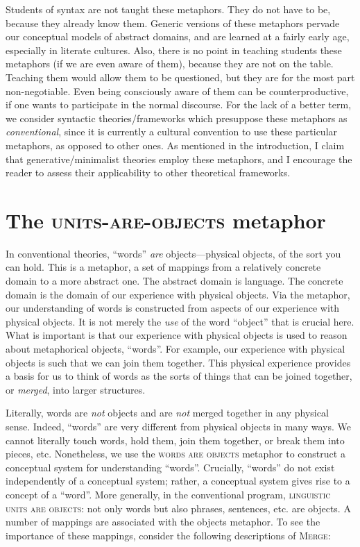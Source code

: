   Students of syntax are not taught these metaphors. They do not have to be, because they already know them. Generic versions of these metaphors pervade our conceptual models of abstract domains, and are learned at a fairly early age, especially in literate cultures. Also, there is no point in teaching students these metaphors (if we are even aware of them), because they are not on the table. Teaching them would allow them to be questioned, but they are for the most part non-negotiable. Even being consciously aware of them can be counterproductive, if one wants to participate in the normal discourse. For the lack of a better term, we consider syntactic theories/frameworks which presuppose these metaphors as \textit{conventional}, since it is currently a cultural convention to use these particular metaphors, as opposed to other ones. As mentioned in the introduction, I claim that generative/minimalist theories employ these metaphors, and I encourage the reader to assess their applicability to other theoretical frameworks.

\section{{The} {\textsc{units-}}{\textsc{are}}{\textsc{{}-objects}}{ metaphor}} 

In conventional theories, “words” \textit{are} objects---physical objects, of the sort you can hold. This is a metaphor, a set of mappings from a relatively concrete domain to a more abstract one. The abstract domain is language. The concrete domain is the domain of our experience with physical objects. Via the metaphor, our understanding of words is constructed from aspects of our experience with physical objects. It is not merely the \textit{use} of the word “object” that is crucial here. What is important is that our experience with physical objects is used to reason about metaphorical objects, “words”. For example, our experience with physical objects is such that we can join them together. This physical experience provides a basis for us to think of words as the sorts of things that can be joined together, or \textit{merged}, into larger structures.

  Literally, words are \textit{not} objects and are \textit{not} merged together in any physical sense. Indeed, “words” are very different from physical objects in many ways. We cannot literally touch words, hold them, join them together, or break them into pieces, etc. Nonetheless, we use the \textsc{words are objects} metaphor to construct a conceptual system for understanding “words”. Crucially, “words” do not exist independently of a conceptual system; rather, a conceptual system gives rise to a concept of a “word”. More generally, in the conventional program, \textsc{linguistic units are objects}: not only words but also phrases, sentences, etc. are objects. A number of mappings are associated with the objects metaphor. To see the importance of these mappings, consider the following descriptions of \textsc{Merge}: 

